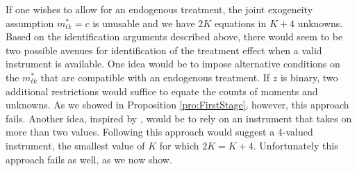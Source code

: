 If one wishes to allow for an endogenous treatment, the joint exogeneity assumption $m_{tk}^*=c$ is unusable and we have $2K$ equations in $K+4$ unknowns.
Based on the identification arguments described above, there would seem to be two possible avenues for identification of the treatment effect when a valid instrument is available.
One idea would be to impose alternative conditions on the $m^*_{tk}$ that are compatible with an endogenous treatment.
If $z$ is binary, two additional restrictions would suffice to equate the counts of moments and unknowns.
As we showed in Proposition \ref{pro:FirstStage}, however, this approach fails. 
Another idea, inspired by \cite{Lewbel}, would be to rely on an instrument that takes on more than two values.
Following this approach would suggest a 4-valued instrument, the smallest value of $K$ for which $2K = K+4$.
Unfortunately this approach fails as well, as we now show.
